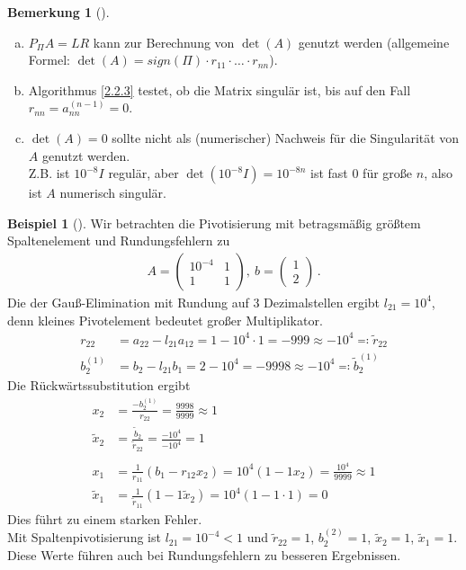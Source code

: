 \documentclass[ngerman,fontsize=11pt, paper=a4, parskip=half, titlepage=true, toc=bib]{scrbook}
\theoremstyle{definition}
\newtheorem{Bsp}[Def]{Beispiel}
\newtheorem{Bem}[Def]{Bemerkung}	%
\theoremstyle{plain}
\newcommand{\subsectione}[1]{\subsection{#1} \addtocounter{Def}{1}}
\newenvironment{Bspe}[1][]{ %
	\begin{Bsp}[#1]
	}
	{
	\end{Bsp}
	\addtocounter{subsection}{1}
}
\newenvironment{Beme}[1][]{ %
	\begin{Bem}[#1]
	}
	{
	\end{Bem}
	\addtocounter{subsection}{1}
}
\begin{document}
\begin{Beme}~
	\begin{enumerate}[a)]
		\item $P_\Pi A=LR$ kann zur Berechnung von $\det(A)$ genutzt werden
		(allgemeine Formel: $\det(A)=sign(\Pi)\cdot r_{11}\cdot \dots \cdot r_{nn}$).
		\item Algorithmus \ref{2.2.3}  testet, ob die Matrix singulär ist,
		bis auf den Fall $r_{nn}=a_{nn}^{(n-1)}=0$.
		\item $\det(A)=0$ sollte nicht als (numerischer) Nachweis für die
		Singularität von $A$ genutzt werden.\\
		Z.B. ist $10^{-8}I$ regulär, aber $\det(10^{-8}I) = 10^{-8n}$ ist fast 0
		für große $n$, also ist $A$ numerisch singulär.
	\end{enumerate}
\end{Beme}

\begin{Bspe}
	Wir betrachten die Pivotisierung mit betragsmäßig größtem Spaltenelement
	und Rundungsfehlern zu
	\begin{gather*}
	A=\begin{pmatrix}
	10^{-4} & 1 \\ 1 & 1
	\end{pmatrix}, ~
	b= \begin{pmatrix*}
	1 \\ 2
	\end{pmatrix*}\, .
	\end{gather*}
	Die der Gauß-Elimination mit Rundung auf 3 Dezimalstellen ergibt
	$l_{21}=10^4$, denn kleines Pivotelement bedeutet großer Multiplikator. \\
	\begin{align*}
	r_{22}&=a_{22}-l_{21}a_{12} = 1-10^4\cdot 1 = -999 \approx -10^4 \eqqcolon \widetilde{r}_{22}\\
	b_2^{(1)} & = b_2-l_{21}b_1 = 2-10^4 = -9998 \approx -10^4 \eqqcolon \widetilde{b}_2^{(1)} 
	\end{align*}
	Die Rückwärtssubstitution ergibt
	\begin{align*}
	x_2 &= \frac{-b_2^{(1)}}{r_{22}} = \frac{9998}{9999} \approx 1\\
	\widetilde{x}_	2 &= \frac{\widetilde{b}_2}{\widetilde{r}_{22}} = \frac{-10^4}{-10^4} = 1 \\\\
	x_1 &= \frac{1}{r_{11}}(b_1-r_{12}x_2)= 10^4 (1-1x_2) = \frac{10^4}{9999}\approx 1\\
	\widetilde{	x}_1 &= \frac{1}{\widetilde{r}_{11}}(1-1\widetilde{x}_2)= 10^4 (1-1\cdot 1) = 0 
	\end{align*}
	Dies führt zu einem starken Fehler.\\
	
	Mit Spaltenpivotisierung ist $l_{21}=10^{-4}<1$ und 
	$\widetilde{r}_{22}=1$, $b_2^{(2)} = 1$, $\widetilde{x}_2=1$, $\widetilde{x}_1=1$.\\
	Diese Werte führen auch bei Rundungsfehlern zu besseren Ergebnissen.
\end{Bspe}
\end{document}
